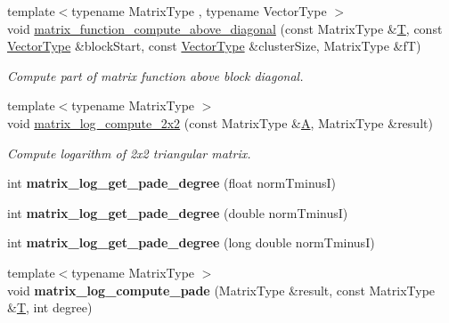 \begin{DoxyCompactItemize}
{\footnotesize template$<$typename Matrix\+Type , typename Vector\+Type $>$ }\\void \hyperlink{namespace_eigen_1_1internal_a8ff76c47bde59d8af688e5925bed8f17}{matrix\+\_\+function\+\_\+compute\+\_\+above\+\_\+diagonal} (const Matrix\+Type \&\hyperlink{group___sparse_core___module}{T}, const \hyperlink{struct_vector_type}{Vector\+Type} \&block\+Start, const \hyperlink{struct_vector_type}{Vector\+Type} \&cluster\+Size, Matrix\+Type \&fT)
\begin{DoxyCompactList}\small\item\em Compute part of matrix function above block diagonal. \end{DoxyCompactList}\item 
\mbox{\label{namespace_eigen_1_1internal_a1cb8d312c017f94570a52317fd1ece5f}} 
{\footnotesize template$<$typename Matrix\+Type $>$ }\\void \hyperlink{namespace_eigen_1_1internal_a1cb8d312c017f94570a52317fd1ece5f}{matrix\+\_\+log\+\_\+compute\+\_\+2x2} (const Matrix\+Type \&\hyperlink{group___core___module_class_eigen_1_1_matrix}{A}, Matrix\+Type \&result)
\begin{DoxyCompactList}\small\item\em Compute logarithm of 2x2 triangular matrix. \end{DoxyCompactList}\item 
\mbox{\label{namespace_eigen_1_1internal_ae0091d6d89ad60b1117bbb1b4b9901d0}} 
int {\bfseries matrix\+\_\+log\+\_\+get\+\_\+pade\+\_\+degree} (float norm\+TminusI)
\item 
\mbox{\label{namespace_eigen_1_1internal_a7cdde7861546c148b2067fd94b3933f0}} 
int {\bfseries matrix\+\_\+log\+\_\+get\+\_\+pade\+\_\+degree} (double norm\+TminusI)
\item 
\mbox{\label{namespace_eigen_1_1internal_ab6cb311dc4965edfa087bc35a9ee99ed}} 
int {\bfseries matrix\+\_\+log\+\_\+get\+\_\+pade\+\_\+degree} (long double norm\+TminusI)
\item 
\mbox{\label{namespace_eigen_1_1internal_a366cdd93d3035b0053cc8b3bff77f2a4}} 
{\footnotesize template$<$typename Matrix\+Type $>$ }\\void {\bfseries matrix\+\_\+log\+\_\+compute\+\_\+pade} (Matrix\+Type \&result, const Matrix\+Type \&\hyperlink{group___sparse_core___module}{T}, int degree)

\end{DoxyCompactItemize}
